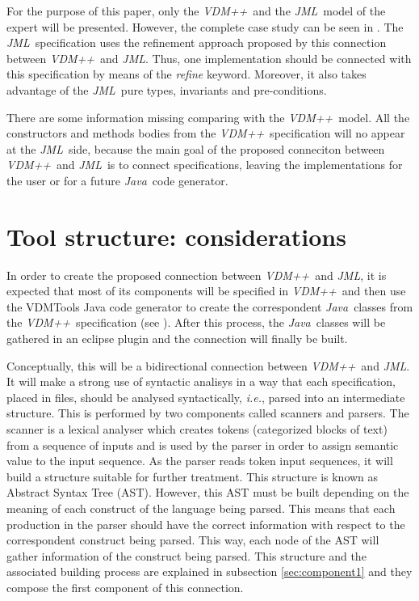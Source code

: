 \documentclass{llncs}
\newcommand{\jml}{\textit{JML}}
\newcommand{\vpp}{\textit{VDM++}}
\newcommand{\java}{\textit{Java}}
\newcommand{\ie}{\textit{i.e.}}
\begin{document}
For the purpose of this paper, only the \vpp\ and the \jml\ model of the expert will be presented. However, the complete case study can be seen in \cite{vppjmlthesis}. The \jml\ specification uses the refinement approach proposed by this connection between \vpp\ and \jml. Thus, one implementation should be connected with this specification by means of the \textit{refine} keyword. Moreover, it also takes advantage of the \jml\ pure types, invariants and pre-conditions. 

{\scriptsize }

There are some information missing comparing with the \vpp\ model. All the constructors and methods bodies from the \vpp\ specification will no appear at the \jml\ side, because the main goal of the proposed conneciton between \vpp\ and \jml\ is to connect specifications, leaving the implementations for the user or for a future \java\ code generator.

\medskip
\begin{vdm}
{\scriptsize }
\end{vdm}

\section{Tool structure: considerations}
\label{sec:req}

In order to create the proposed connection between \vpp\ and \jml, it is expected that most of its components will be specified in \vpp\ and then use the VDMTools Java code generator to create the correspondent \java\ classes from the \vpp\ specification (see \cite{vpp2javacg}). After this process, the \java\ classes will be gathered in an eclipse plugin and the connection will finally be built. 

Conceptually, this will be a bidirectional connection between \vpp\ and \jml. It will make a strong use of syntactic analisys in a way that each specification, placed in files, should be analysed syntactically, \ie, parsed into an intermediate structure. This is performed by two components called scanners and parsers. The scanner is a lexical analyser which creates tokens (categorized blocks of text) from a sequence of inputs and is used by the parser in order to assign semantic value to the input sequence. As the parser reads token input sequences, it will build a structure suitable for further treatment. This structure is known as Abstract Syntax Tree (AST). However, this AST must be built depending on the meaning of each construct of the language being parsed. This means that each production in the parser should have the correct information with respect to the correspondent construct being parsed. This way, each node of the AST will gather information of the construct being parsed. This structure and the associated building process are explained in subsection \ref{sec:component1} and they compose the first component of this connection. 
\end{document}
